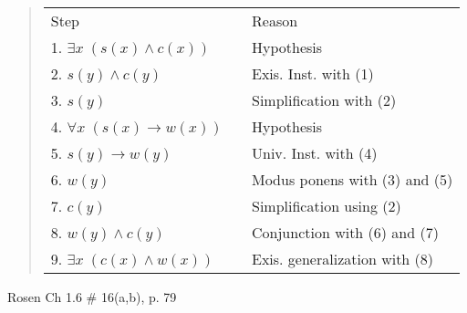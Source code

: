 \documentclass[12pt,addpoints]{exam}
\begin{document}
\begin{questions}
\begin{solution}
\begin{quote}
    \smallskip
    \begin{tabular}{lll}
        Step        & \hspace{0.2in} & Reason \\
        1. $\exists x\; (s(x) \wedge c(x))$  &   & Hypothesis \\
        2. $s(y) \wedge c(y)$               &   & Exis. Inst. with (1) \\
        3. $s(y)$                           &   & Simplification with (2) \\
        4. $\forall x\; (s(x) \rightarrow w(x))$ &  & Hypothesis \\
        5. $s(y) \rightarrow w(y)$          & & Univ. Inst. with (4) \\
        6. $w(y)$                           & & Modus ponens with (3) and (5) \\
        7. $c(y)$                           & & Simplification using (2) \\
        8. $w(y) \wedge c(y)$               & & Conjunction with (6) and (7) \\
        9. $\exists x\; (c(x) \wedge w(x))$ &   & Exis. generalization with (8) \\
    \end{tabular}
\end{quote}
\end{solution}

\question[8] Rosen Ch 1.6 \# 16(a,b), p. 79


\end{questions}
\end{document}

